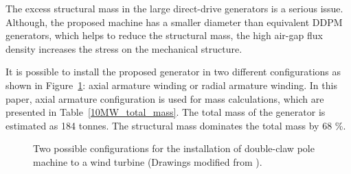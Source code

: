 \documentclass[12pt]{iopart}
\begin{document}
The excess structural mass in the large direct-drive generators is a serious issue. Although, the proposed machine has a smaller diameter than equivalent DDPM generators, which helps to reduce the structural mass, the high air-gap flux density increases the stress on the mechanical structure.

It is possible to install the proposed generator in two different configurations as shown in Figure~\ref{DD_claw_pole_structures}: axial armature winding or radial armature winding. In this paper, axial armature configuration is used for mass calculations, which are presented in Table~\ref{10MW_total_mass}. The total mass of the generator is estimated as 184 tonnes. The structural mass dominates the total mass by 68 \%.

\begin{figure}[]
  \centering
  \hfill
   \caption{Two possible configurations for the installation of double-claw pole machine to a wind turbine (Drawings modified from \cite{Bang2010}).} 
    \label{DD_claw_pole_structures}
\end{figure}
\end{document}
